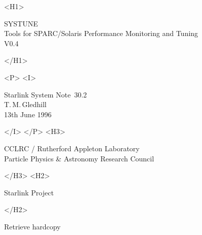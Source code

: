 \documentclass[11pt]{article}
\newcommand{\stardoccategory}  {Starlink System Note}
\newcommand{\stardocnumber}    {30.2}
\newcommand{\stardocsource}    {ssn\stardocnumber}
\newcommand{\stardocauthors}   {T.\,M.\,Gledhill}
\newcommand{\stardocdate}      {13th June 1996}
\newcommand{\stardoctitle}     {SYSTUNE\\[1ex]
 Tools for SPARC/Solaris Performance Monitoring and Tuning\\[1ex]
V0.4}
\newcommand{\htmladdnormallink}[2]{#1}
\newcommand{\htmladdimg}[1]{}
\newcommand{\htmlref}[2]{#1}
\newcommand{\htmladdtonavigation}[1]{}
\newcommand{\xlabel}[1]{}
\begin{document}
\begin{htmlonly}
   \xlabel{}
   \begin{rawhtml} <H1> \end{rawhtml}
      \stardoctitle
   \begin{rawhtml} </H1> \end{rawhtml}


   \begin{rawhtml} <P> <I> \end{rawhtml}
   \stardoccategory\ \stardocnumber \\
   \stardocauthors \\
   \stardocdate
   \begin{rawhtml} </I> </P> <H3> \end{rawhtml}
      \htmladdnormallink{CCLRC}{http://www.cclrc.ac.uk} /
      \htmladdnormallink{Rutherford Appleton Laboratory}
                        {http://www.cclrc.ac.uk/ral} \\
      Particle Physics \& Astronomy Research Council \\
   \begin{rawhtml} </H3> <H2> \end{rawhtml}
      \htmladdnormallink{Starlink Project}{http://www.starlink.ac.uk/}
   \begin{rawhtml} </H2> \end{rawhtml}
   \htmladdnormallink{\htmladdimg{source.gif} Retrieve hardcopy}
      {http://www.starlink.ac.uk/cgi-bin/hcserver?\stardocsource}\\



\end{htmlonly}
\end{document}
